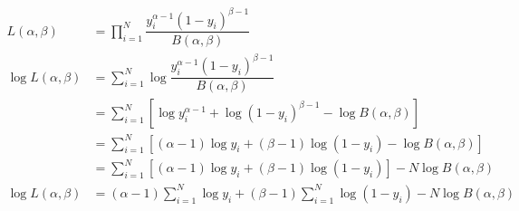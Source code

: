 \documentclass[border=3bp,varwidth=7in]{standalone}
\begin{document}
\[
\begin{aligned}
L(\alpha, \beta) &= \displaystyle\prod_{i = 1}^N \dfrac{y_i^{\alpha - 1}(1 - y_i)^{\beta - 1}}{B(\alpha, \beta)}\\
\log L(\alpha, \beta) &= \displaystyle\sum_{i = 1}^N \log \dfrac{y_i^{\alpha - 1}(1 - y_i)^{\beta - 1}}{B(\alpha, \beta)}\\
&= \displaystyle\sum_{i = 1}^N \left[ \log y_i^{\alpha - 1} + \log (1 - y_i)^{\beta - 1} - \log B(\alpha, \beta)\right]\\
&= \displaystyle\sum_{i = 1}^N \left[ (\alpha - 1)\log y_i + (\beta - 1)\log (1 - y_i) - \log B(\alpha, \beta)\right]\\
&= \displaystyle\sum_{i = 1}^N \left[ (\alpha - 1)\log y_i + (\beta - 1)\log (1 - y_i)\right] - N \log B(\alpha, \beta)\\
\log L(\alpha, \beta) &= (\alpha - 1) \sum_{i = 1}^N \log y_i + (\beta - 1) \sum_{i = 1}^N \log (1 - y_i) - N \log B(\alpha, \beta)
\end{aligned}
\]
\end{document}

